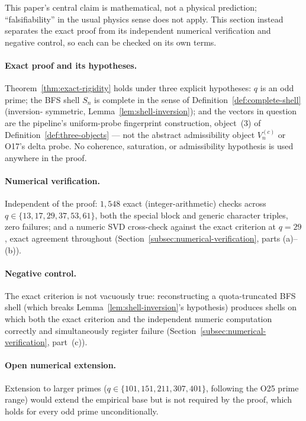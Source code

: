 \documentclass[11pt,a4paper]{article}
\begin{document}
  This paper's central claim is mathematical, not a physical prediction; ``falsifiability'' in the
  usual physics sense does not apply. This section instead separates the exact proof from its
  independent numerical verification and negative control, so each can be checked on its own terms.

  \paragraph{Exact proof and its hypotheses.}
    Theorem~\ref{thm:exact-rigidity} holds under three explicit hypotheses: $q$ is an odd prime; the
    BFS shell $S_n$ is complete in the sense of Definition~\ref{def:complete-shell} (inversion-
    symmetric, Lemma~\ref{lem:shell-inversion}); and the vectors in question are the pipeline's
    uniform-probe fingerprint construction, object~(3) of Definition~\ref{def:three-objects} ---
    not the abstract admissibility object $V_n^{(c)}$ or O17's delta probe. No coherence,
    saturation, or admissibility hypothesis is used anywhere in the proof.

  \paragraph{Numerical verification.}
    Independent of the proof: $1{,}548$ exact (integer-arithmetic) checks across
    $q \in \{13,17,29,37,53,61\}$, both the special block and generic character triples, zero
    failures; and a numeric SVD cross-check against the exact criterion at $q=29$, exact agreement
    throughout (Section~\ref{subsec:numerical-verification}, parts (a)--(b)).

  \paragraph{Negative control.}
    The exact criterion is not vacuously true: reconstructing a quota-truncated BFS shell (which
    breaks Lemma~\ref{lem:shell-inversion}'s hypothesis) produces shells on which both the exact
    criterion and the independent numeric computation correctly and simultaneously register failure
    (Section~\ref{subsec:numerical-verification}, part~(c)).

  \begin{sloppypar}
  \paragraph{Open numerical extension.}
    Extension to larger primes ($q \in \{101, 151, 211, 307, 401\}$, following the O25 prime range)
    would extend the empirical base but is not required by the proof, which holds for every odd
    prime unconditionally.
  \end{sloppypar}
\end{document}
